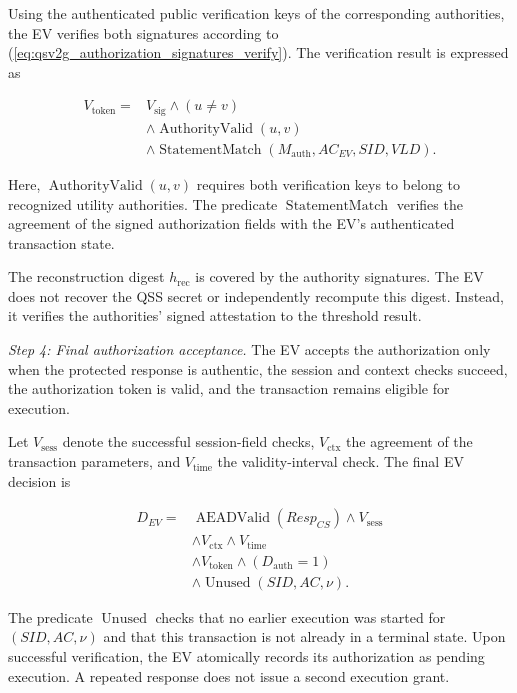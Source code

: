 \documentclass[twocolumn,10pt,journal]{IEEEtran}
\begin{document}
Using the authenticated public verification
keys of the corresponding authorities,
the EV verifies both signatures according
to (\ref{eq:qsv2g_authorization_signatures_verify}).
The verification result is expressed as

\begin{equation}
\begin{aligned}
V_{\mathrm{token}}
={}&V_{\mathrm{sig}}
\land (u\neq v)\\
&\land \operatorname{AuthorityValid}(u,v)\\
&\land \operatorname{StatementMatch}
(M_{\mathrm{auth}},AC_{EV},SID,VLD).
\end{aligned}
\label{eq:qsv2g_ev_token_verify}
\end{equation}

Here, $\operatorname{AuthorityValid}(u,v)$
requires both verification keys to belong to
recognized utility authorities. The predicate
$\operatorname{StatementMatch}$ verifies the
agreement of the signed authorization fields
with the EV's authenticated transaction state.

The reconstruction digest $h_{\mathrm{rec}}$
is covered by the authority signatures.
The EV does not recover the QSS secret or
independently recompute this digest. Instead,
it verifies the authorities' signed
attestation to the threshold result.

\textit{Step 4: Final authorization acceptance.}
The EV accepts the authorization only when
the protected response is authentic, the
session and context checks succeed, the
authorization token is valid, and the
transaction remains eligible for execution.

Let $V_{\mathrm{sess}}$ denote the successful
session-field checks, $V_{\mathrm{ctx}}$
the agreement of the transaction parameters,
and $V_{\mathrm{time}}$ the validity-interval
check. The final EV decision is

\begin{equation}
\begin{aligned}
D_{EV}
={}&
\operatorname{AEADValid}(Resp_{CS})
\land V_{\mathrm{sess}}\\
&\land V_{\mathrm{ctx}}
\land V_{\mathrm{time}}\\
&\land V_{\mathrm{token}}
\land (D_{\mathrm{auth}}=1)\\
&\land
\operatorname{Unused}(SID,AC,\nu).
\end{aligned}
\label{eq:qsv2g_ev_final_decision}
\end{equation}

The predicate $\operatorname{Unused}$ checks that no earlier
execution was started for $(SID,AC,\nu)$ and that this transaction
is not already in a terminal state. Upon successful verification,
the EV atomically records its authorization as pending execution.
A repeated response does not issue a second execution grant.
\end{document}
